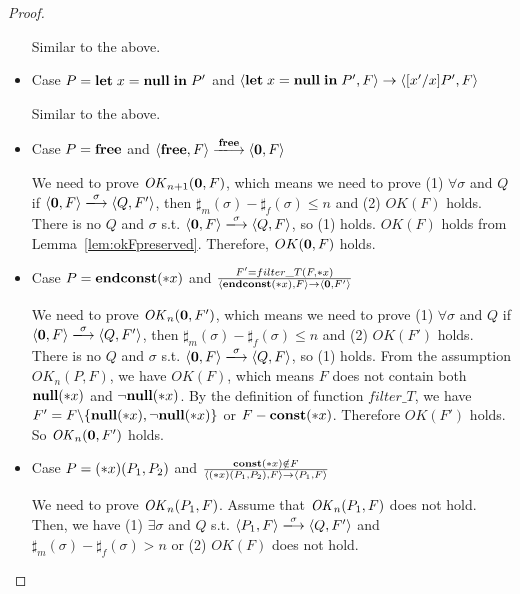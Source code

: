 \begin{proof}
\begin{itemize}
    Similar to the above.
  
\item Case \(P = \mathbf{let}\; x = \mathbf{null} \; \mathbf{in}\; P'\) and \( \langle \mathbf{let}\; x = \mathbf{null} \;
  \mathbf{in}\; P', F \rangle \rightarrow \langle [x'/x]P', F \rangle\)
  
    Similar to the above.
  
\item Case \(P = \mathbf{free}\) and \(\langle \Free, F \rangle
  \xlongrightarrow{\Free} \langle {\bf 0}, F \rangle \)

  We need to prove \(\mathit{OK}_{n+1}({\bf 0}, F)\), which means we need to
  prove (1) \( \forall \sigma \) and \(Q\) if \( \langle {\bf 0}, F
  \rangle \xlongrightarrow{\sigma} \langle Q, F' \rangle \), then
  \(\sharp_{m}(\sigma) - \sharp_{f}(\sigma) \le n\) and (2) \( OK(F)\)
  holds.  There is no \(Q\) and \(\sigma\) s.t. \(\langle {\bf 0}, F
  \rangle \xlongrightarrow{\sigma} \langle Q, F \rangle \), so (1)
  holds.  \(OK(F)\) holds from
  Lemma~\ref{lem:okFpreserved}. Therefore, \(OK({\bf 0}, F)\) holds.

\item Case \(P = \mathbf{endconst}(*x)\) and \(\frac {F' = filter\_T(F, *x) }
  {\langle \mathbf{endconst}(*x), F \rangle \rightarrow \langle {\bf 0}, F' \rangle} \)

  We need to prove \(\mathit{OK}_n({\bf 0}, F')\), which means we need to
  prove (1) \( \forall \sigma \) and \(Q\) if \( \langle {\bf 0}, F
  \rangle \xlongrightarrow{\sigma} \langle Q, F' \rangle \), then
  \(\sharp_{m}(\sigma) - \sharp_{f}(\sigma) \le n\) and (2) \(
  OK(F')\) holds.  There is no \(Q\) and \(\sigma\) s.t. \(\langle
  {\bf 0}, F \rangle \xlongrightarrow{\sigma} \langle Q, F \rangle \),
  so (1) holds.  From the assumption \(OK_n(P, F)\), we have
  \(OK(F)\), which means \(F\) does not contain both \({\bf null}(*x)\) and
  \(\neg{\bf null}(*x)\). By the definition of function \(filter\_T\), we have
  \(F' = F\backslash\{{\bf null}(*x), \neg{\bf null}(*x)\}\) or \(F - \mathbf{const}(*x)
  \). Therefore \(OK(F')\) holds. So \(\mathit{OK}_n({\bf 0}, F')\) holds.
  
    
\item Case \( P = (*x)(P_1,P_2) \) and \( \frac{ \mathbf{const}(*x) \notin F}
  { \langle (*x)(P_1, P_2), F \rangle \rightarrow \langle P_1, F
    \rangle } \)

  We need to prove \(\mathit{OK}_n(P_1, F)\).  Assume that \(\mathit{OK}_n(P_1, F)\)
  does not hold. Then, we have (1) \( \exists \sigma \) and \(Q\)
  s.t. \( \langle P_1, F \rangle \xlongrightarrow{\sigma} \langle Q,
  F' \rangle \) and \(\sharp_{m}(\sigma) -
  \sharp_{f}(\sigma) > n\) or (2) \( OK(F)\) does not hold.


\end{itemize}
\end{proof}
